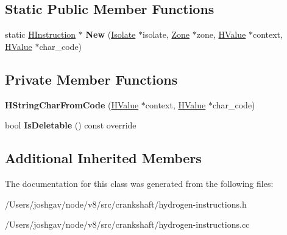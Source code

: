 \subsection*{Static Public Member Functions}
\begin{DoxyCompactItemize}
\item 
static \hyperlink{classv8_1_1internal_1_1_h_instruction}{H\+Instruction} $\ast$ {\bfseries New} (\hyperlink{classv8_1_1internal_1_1_isolate}{Isolate} $\ast$isolate, \hyperlink{classv8_1_1internal_1_1_zone}{Zone} $\ast$zone, \hyperlink{classv8_1_1internal_1_1_h_value}{H\+Value} $\ast$context, \hyperlink{classv8_1_1internal_1_1_h_value}{H\+Value} $\ast$char\+\_\+code)\hypertarget{classv8_1_1internal_1_1_h_string_char_from_code_a3edb025fc44412088cb4c7b6d5b21c78}{}\label{classv8_1_1internal_1_1_h_string_char_from_code_a3edb025fc44412088cb4c7b6d5b21c78}

\end{DoxyCompactItemize}
\subsection*{Private Member Functions}
\begin{DoxyCompactItemize}
\item 
{\bfseries H\+String\+Char\+From\+Code} (\hyperlink{classv8_1_1internal_1_1_h_value}{H\+Value} $\ast$context, \hyperlink{classv8_1_1internal_1_1_h_value}{H\+Value} $\ast$char\+\_\+code)\hypertarget{classv8_1_1internal_1_1_h_string_char_from_code_a8d678a6d9b09abaf4c690e33f9119548}{}\label{classv8_1_1internal_1_1_h_string_char_from_code_a8d678a6d9b09abaf4c690e33f9119548}

\item 
bool {\bfseries Is\+Deletable} () const  override\hypertarget{classv8_1_1internal_1_1_h_string_char_from_code_adeb2a4a21870e2285ce8d34133f30501}{}\label{classv8_1_1internal_1_1_h_string_char_from_code_adeb2a4a21870e2285ce8d34133f30501}

\end{DoxyCompactItemize}
\subsection*{Additional Inherited Members}


The documentation for this class was generated from the following files\+:\begin{DoxyCompactItemize}
\item 
/\+Users/joshgav/node/v8/src/crankshaft/hydrogen-\/instructions.\+h\item 
/\+Users/joshgav/node/v8/src/crankshaft/hydrogen-\/instructions.\+cc\end{DoxyCompactItemize}
